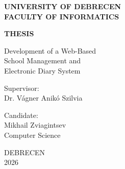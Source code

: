 \documentclass[12pt,a4paper]{report}
\begin{document}
\begin{titlepage}
\centering
\vspace*{1.2cm}
{\LARGE\bfseries UNIVERSITY OF DEBRECEN\\[4pt] FACULTY OF INFORMATICS\par}
\vspace{4.2cm}
{\Large\bfseries THESIS\par}
\vspace{1.0cm}
{\Large Development of a Web-Based\\[3pt] School Management and\\[3pt] Electronic Diary System\par}
\vfill
\begin{minipage}[t]{0.46\textwidth}\raggedright
Supervisor:\\ Dr. V\'agner Anik\'o Szilvia
\end{minipage}\hfill
\begin{minipage}[t]{0.40\textwidth}\raggedright
Candidate:\\ Mikhail Zviagintsev\\ Computer Science
\end{minipage}
\vspace{2.2cm}

{\Large DEBRECEN\\ 2026\par}
\end{titlepage}

\renewcommand{\contentsname}{Table of Contents}
\setcounter{page}{1}
\tableofcontents
\clearpage









\end{document}
